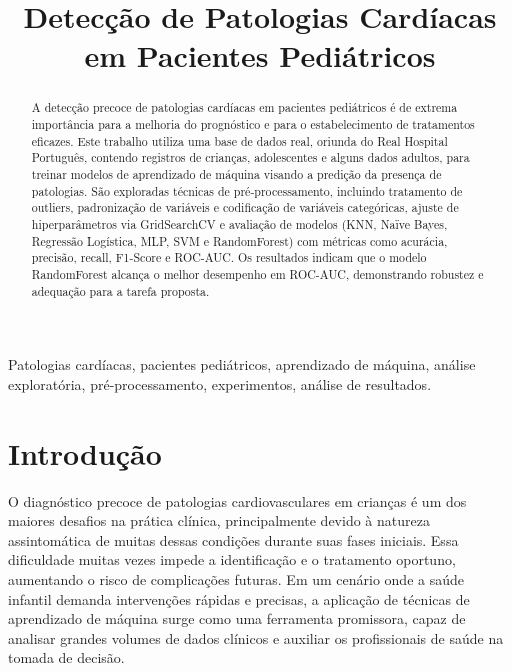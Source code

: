 \documentclass[conference]{IEEEtran}
\begin{document}

\title{Detecção de Patologias Cardíacas em Pacientes Pediátricos}

\author{
}

\maketitle


\begin{abstract}
A detecção precoce de patologias cardíacas em pacientes pediátricos é de extrema importância para a melhoria do prognóstico e para o estabelecimento de tratamentos eficazes. Este trabalho utiliza uma base de dados real, oriunda do Real Hospital Português, contendo registros de crianças, adolescentes e alguns dados adultos, para treinar modelos de aprendizado de máquina visando a predição da presença de patologias. São exploradas técnicas de pré-processamento, incluindo tratamento de outliers, padronização de variáveis e codificação de variáveis categóricas, ajuste de hiperparâmetros via GridSearchCV e avaliação de modelos (KNN, Naïve Bayes, Regressão Logística, MLP, SVM e RandomForest) com métricas como acurácia, precisão, recall, F1-Score e ROC-AUC. Os resultados indicam que o modelo RandomForest alcança o melhor desempenho em ROC-AUC, demonstrando robustez e adequação para a tarefa proposta.
\end{abstract}

\begin{IEEEkeywords}
Patologias cardíacas, pacientes pediátricos, aprendizado de máquina, análise exploratória, pré-processamento, experimentos, análise de resultados.
\end{IEEEkeywords}


\section{Introdução}
O diagnóstico precoce de patologias cardiovasculares em crianças é um dos maiores desafios na prática clínica, principalmente devido à natureza assintomática de muitas dessas condições durante suas fases iniciais. Essa dificuldade muitas vezes impede a identificação e o tratamento oportuno, aumentando o risco de complicações futuras. Em um cenário onde a saúde infantil demanda intervenções rápidas e precisas, a aplicação de técnicas de aprendizado de máquina surge como uma ferramenta promissora, capaz de analisar grandes volumes de dados clínicos e auxiliar os profissionais de saúde na tomada de decisão.
\end{document}
